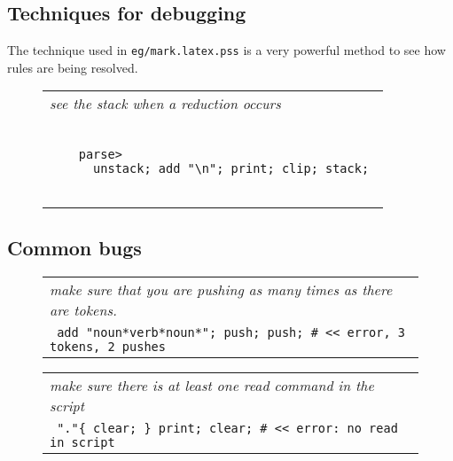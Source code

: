 \documentclass[a4paper,12pt]{article}
\begin{document}
\subsection{Techniques for debugging}

  The technique used in \texttt{eg/mark.latex.pss} is a very powerful method
  to see how rules are being resolved.
 \begin{figure}
 \begin{tabular}{ l }
 \emph{ see the stack when a reduction occurs } \\ 
 \begin{lstlisting}[breaklines] 

    parse>
      unstack; add "\n"; print; clip; stack; 
  
 \end{lstlisting} 
 \end{tabular} 

 \end{figure}

\subsection{Common bugs}
 \begin{figure}
 \begin{tabular}{ l }
 \emph{ make sure that you are pushing as many times as there are tokens. } \\ 
 \verb| add "noun*verb*noun*"; push; push; # << error, 3 tokens, 2 pushes |
 \end{tabular} 
 \end{figure}
 \begin{figure}
 \begin{tabular}{ l }
 \emph{ make sure there is at least one read command in the script  } \\ 
 \verb| "."{ clear; } print; clear; # << error: no read in script |
 \end{tabular} 
 \end{figure}
\end{document}
